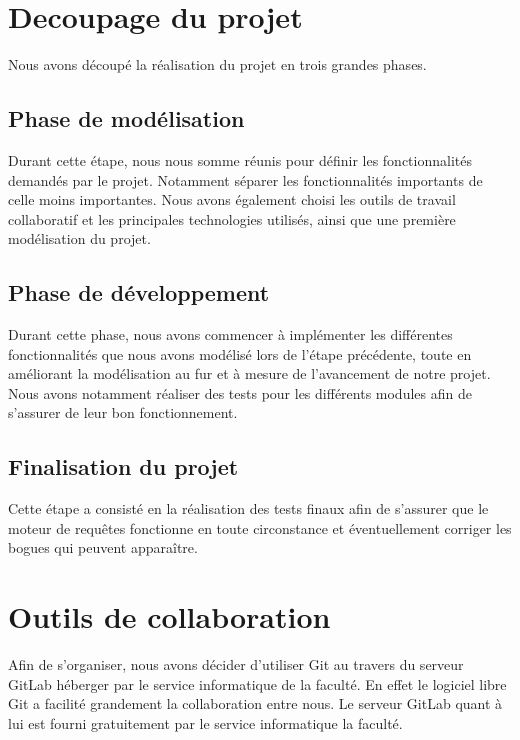 \documentclass[oneside,13pt,a4paper]{report}
\begin{document}
        \section{Decoupage du projet}

            Nous avons découpé la réalisation du projet en trois grandes phases.

            \subsection{Phase de modélisation}
                
                Durant cette étape, nous nous somme réunis pour définir les fonctionnalités demandés par le projet. Notamment séparer les fonctionnalités importants de celle moins importantes. Nous avons également choisi les outils de travail collaboratif et les principales technologies utilisés, ainsi que une première modélisation du projet.

            \subsection{Phase de développement}
                
                Durant cette phase, nous avons commencer à implémenter les différentes fonctionnalités que nous avons modélisé lors de l’étape précédente, toute en améliorant la modélisation au fur et à mesure de l’avancement de notre projet. Nous avons notamment réaliser des tests pour les différents modules afin de s’assurer de leur bon fonctionnement.
            
            \subsection{Finalisation du projet}

                Cette étape a consisté en la réalisation des tests finaux afin de s’assurer que le moteur de requêtes fonctionne en toute circonstance et éventuellement corriger les bogues qui peuvent apparaître.
            
        \section{Outils de collaboration}

            Afin de s’organiser, nous avons décider d’utiliser Git au travers du serveur GitLab héberger par le service informatique de la faculté. En effet le logiciel libre Git a facilité grandement la collaboration entre nous. Le serveur GitLab quant à lui est fourni gratuitement par le service informatique la faculté.
\end{document}
